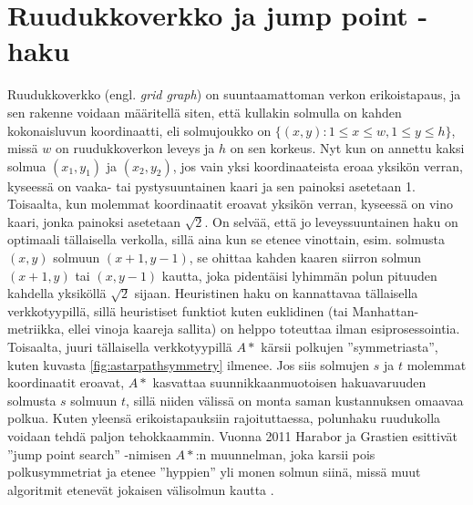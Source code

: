 \documentclass[finnish]{tktltiki2}
\theoremstyle{definition}
\theoremstyle{remark}
\begin{document}
\section{Ruudukkoverkko ja jump point -haku}
Ruudukkoverkko (engl. \textit{grid graph}) on suuntaamattoman verkon erikoistapaus, ja sen rakenne voidaan määritellä siten, että kullakin solmulla on kahden kokonaisluvun koordinaatti, eli solmujoukko on $\{ (x, y) \colon 1 \leq x \leq w, 1 \leq y \leq h \}$, missä $w$ on ruudukkoverkon leveys ja $h$ on sen korkeus. Nyt kun on annettu kaksi solmua $(x_1, y_1)$ ja $(x_2, y_2)$, jos vain yksi koordinaateista eroaa yksikön verran, kyseessä on vaaka- tai pystysuuntainen kaari ja sen painoksi asetetaan 1. Toisaalta, kun molemmat koordinaatit eroavat yksikön verran, kyseessä on vino kaari, jonka painoksi asetetaan $\sqrt{2}$. On selvää, että jo leveyssuuntainen haku on optimaali tällaisella verkolla, sillä aina kun se etenee vinottain, esim. solmusta $(x, y)$ solmuun $(x + 1, y - 1)$, se ohittaa kahden kaaren siirron solmun $(x + 1, y)$ tai $(x, y - 1)$ kautta, joka pidentäisi lyhimmän polun pituuden kahdella yksiköllä $\sqrt{2}$ sijaan. Heuristinen haku on kannattavaa tällaisella verkkotyypillä, sillä heuristiset funktiot kuten euklidinen (tai Manhattan-metriikka, ellei vinoja kaareja sallita) on helppo toteuttaa ilman esiprosessointia. Toisaalta, juuri tällaisella verkkotyypillä $A\ast$ kärsii polkujen ''symmetriasta'', kuten kuvasta \ref{fig:astarpathsymmetry} ilmenee. Jos siis solmujen $s$ ja $t$ molemmat koordinaatit eroavat, $A\ast$ kasvattaa suunnikkaanmuotoisen hakuavaruuden solmusta $s$ solmuun $t$, sillä niiden välissä on monta saman kustannuksen omaavaa polkua. Kuten yleensä erikoistapauksiin  rajoituttaessa, polunhaku ruudukolla voidaan tehdä paljon tehokkaammin. Vuonna 2011 Harabor ja Grastien esittivät ''jump point search'' -nimisen $A\ast$:n muunnelman, joka karsii pois polkusymmetriat ja etenee ''hyppien'' yli monen solmun siinä, missä muut algoritmit etenevät jokaisen välisolmun kautta \cite{Harabor11}.
\end{document}
